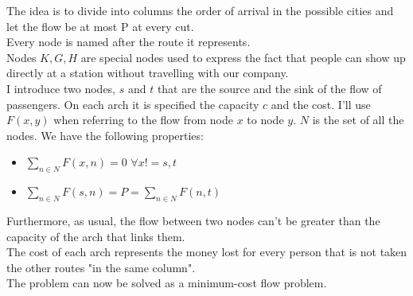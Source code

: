 \documentclass[1pt]{article}
\begin{document}
		The idea is to divide into columns the order of arrival in the possible cities and let the flow be at most P at every cut. \\
		Every node is named after the route it represents.\\
		Nodes $K, G, H$ are special nodes used to express the fact that people can show up directly at a station without travelling with our company.\\
		I introduce two nodes, $s$ and $t$ that are the source and the sink of the flow of passengers. On each arch it is specified the capacity $c$ and the cost. I'll use $F(x,y)$ when referring to the flow from node $x$ to node $y$. $N$ is the set of all the nodes. We have the following properties: 
		\begin{itemize}
		\item $\sum_{n \in N} F(x,n) = 0$  $\forall x != s,t$
		\item $\sum_{n \in N} F(s,n) = P = \sum_{n \in N} F(n,t)$ 
		\end{itemize}
		Furthermore, as usual, the flow between two nodes can't be greater than the capacity of the arch that links them.\\
		The cost of each arch represents the money lost for every person that is not taken the other routes "in the same column". \\
		The problem can now be solved as a minimum-cost flow problem.
\end{document}
